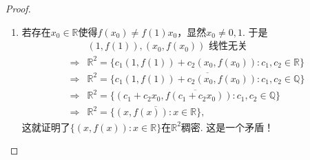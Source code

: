\documentclass[lang=cn,newtx,10pt,scheme=chinese]{elegantbook}
\begin{document}
\begin{proof}
\begin{enumerate}
\item 若存在\(x_0\in\mathbb{R}\)使得\(f(x_0)\neq f(1)x_0\)，显然\(x_0\neq0,1\). 于是
\begin{align*}
&(1,f(1)),(x_0,f(x_0))\text{ 线性无关}\\
\Rightarrow&\mathbb{R}^2=\{c_1(1,f(1))+c_2(x_0,f(x_0)):c_1,c_2\in\mathbb{R}\}\\
\Rightarrow&\mathbb{R}^2=\overline{\{c_1(1,f(1))+c_2(x_0,f(x_0)):c_1,c_2\in\mathbb{Q}\}}\\
\Rightarrow&\mathbb{R}^2=\overline{\{(c_1 + c_2x_0,f(c_1 + c_2x_0)):c_1,c_2\in\mathbb{Q}\}}\\
\Rightarrow&\mathbb{R}^2=\overline{\{(x,f(x)):x\in\mathbb{R}\}},
\end{align*}
这就证明了\(\{(x,f(x)):x\in\mathbb{R}\}\)在\(\mathbb{R}^2\)稠密. 这是一个矛盾！
\end{enumerate}
\end{proof}
\end{document}
